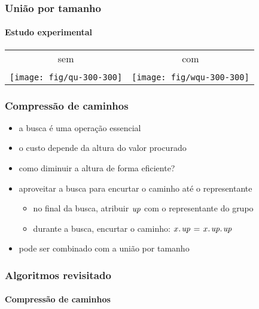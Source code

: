 \documentclass{beamer}
\begin{document}
\begin{frame}
\frametitle{União por tamanho}
\framesubtitle{Estudo experimental}

\begin{tabular}[t]{cc}
sem & com \\
\\
\texttt{[image: fig/qu-300-300]}
&
\texttt{[image: fig/wqu-300-300]}
\end{tabular}

\end{frame}

\begin{frame}
\frametitle{Compressão de caminhos}

\begin{itemize}
\item a busca é uma operação essencial
\item o custo depende da altura do valor procurado
\item como diminuir a altura de forma eficiente?
\pause
\item aproveitar a busca para \alert{encurtar} o caminho até o representante
\begin{itemize}
\item no final da busca, atribuir $\id{up}$ com o representante do grupo
\item durante a busca, encurtar o caminho: $\attrib{x}{up} \gets \attrib{\attrib{x}{up}}{up}$
\end{itemize}
\item pode ser combinado com a união por tamanho
\end{itemize}
\end{frame}

\begin{frame}
\frametitle{Algoritmos revisitado}
\framesubtitle{Compressão de caminhos}

\begin{itemize}
\end{itemize}

\end{frame}
\end{document}

